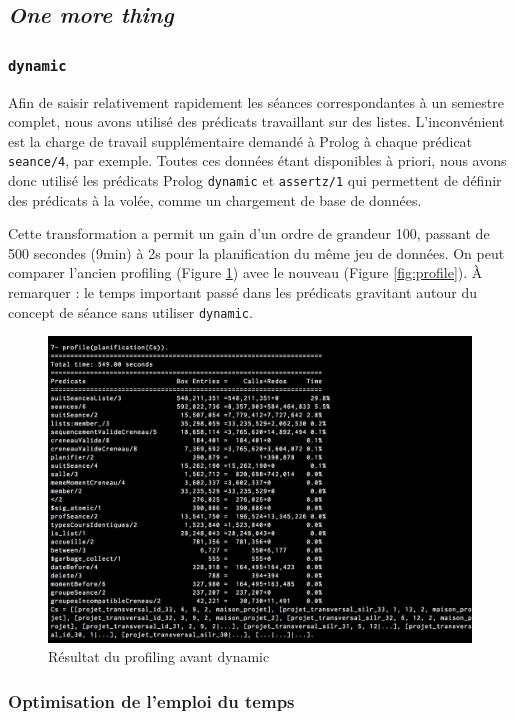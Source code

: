 
\subsection{\textit{One more thing}}

\subsubsection{\texttt{dynamic}}

Afin de saisir relativement rapidement les séances correspondantes à un semestre
complet, nous avons utilisé des prédicats travaillant sur des listes.
L'inconvénient est la charge de travail supplémentaire demandé à Prolog à chaque
prédicat \texttt{seance/4}, par exemple.
Toutes ces données étant disponibles à priori, nous avons donc utilisé les
prédicats Prolog \texttt{dynamic} et \texttt{assertz/1} qui permettent de
définir des prédicats à la volée, comme un chargement de base de données.

Cette transformation a permit un gain d'un ordre de grandeur 100, passant de 500
secondes (9min) à 2s
pour la planification du même jeu de données. On peut comparer l'ancien
profiling (Figure \ref{fig:profile9min}) avec le nouveau (Figure
\ref{fig:profile}). À remarquer : le temps important passé dans les prédicats
gravitant autour du concept de séance sans utiliser \texttt{dynamic}.

\begin{figure}[H]
	\centering
    \includegraphics[keepaspectratio=true,width=12cm]{profile9min.png}
        \caption{\label{fig:profile9min} Résultat du profiling avant dynamic}
\end{figure}

\subsubsection{Optimisation de l'emploi du temps}

